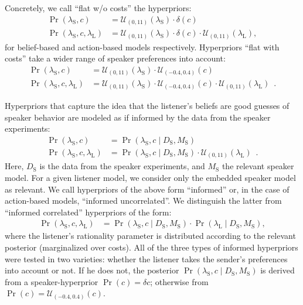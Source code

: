 Concretely, we call ``flat w/o costs'' the hyperpriors:
\begin{align*}
  \Pr(\lambda_\mathrm{S},c) & =
  \mathcal{U}_{(0,11)}(\lambda_\mathrm{S}) \cdot
  \delta(c) \\
  \Pr(\lambda_\mathrm{S},c,\lambda_\mathrm{L}) & = 
  \mathcal{U}_{(0,11)}(\lambda_\mathrm{S}) \cdot
    \delta(c) \cdot  \mathcal{U}_{(0,11)}(
    \lambda_\mathrm{L}),
\end{align*}
for belief-based and action-based models respectively. Hyperpriors
``flat with costs'' take a wider range of speaker preferences into
account: 
\begin{align*}
  \Pr(\lambda_\mathrm{S},c) & =
  \mathcal{U}_{(0,11)}(\lambda_\mathrm{S}) \cdot
  \mathcal{U}_{(-0.4,0.4)}(c) \\
  \Pr(\lambda_\mathrm{S},c,\lambda_\mathrm{L}) & = 
  \mathcal{U}_{(0,11)}(\lambda_\mathrm{S}) \cdot
    \mathcal{U}_{(-0.4,0.4)}(c) \cdot  \mathcal{U}_{(0,11)}(
    \lambda_\mathrm{L}) \enspace .
\end{align*}

Hyperpriors that capture the idea that the listener's beliefs are good
guesses of speaker behavior are modeled as if informed by the data
from the speaker experiments:
\begin{align*}
  \Pr(\lambda_\mathrm{S},c) & = \Pr(\lambda_\mathrm{S},c \mid D_\mathrm{S}, M_\mathrm{S}) \\
  \Pr(\lambda_\mathrm{S},c,\lambda_\mathrm{L}) & = 
   \Pr(\lambda_\mathrm{S},c \mid D_\mathrm{S}, M_\mathrm{S}) \cdot  \mathcal{U}_{(0,11)}(
    \lambda_\mathrm{L}) \enspace .
\end{align*}
Here, $D_\mathrm{S}$ is the data from the speaker experiments, and
$M_\mathrm{S}$ the relevant speaker model. For a given listener model,
we consider only the embedded speaker model as relevant. We call
hyperpriors of the above form ``informed'' or, in the case of
action-based models, ``informed uncorrelated''. We distinguish the
latter from ``informed correlated'' hyperpriors of the form:
\begin{align*}
  \Pr(\lambda_\mathrm{S},c,\lambda_\mathrm{L}) & = 
   \Pr(\lambda_\mathrm{S},c \mid D_\mathrm{S}, M_\mathrm{S}) \cdot \Pr(\lambda_\mathrm{L} \mid D_\mathrm{S}, M_\mathrm{S}),
\end{align*}
where the listener's rationality parameter is distributed according to
the relevant posterior (marginalized over costs). All of the three
types of informed hyperpriors were tested in two varieties: whether
the listener takes the sender's preferences into account or not. If he
does not, the posterior $\Pr(\lambda_\mathrm{S},c \mid D_\mathrm{S},
M_\mathrm{S})$ is derived from a speaker-hyperprior $\Pr(c) =
\delta{c}$; otherwise from $\Pr(c) = \mathcal{U}_{(-0.4,0.4)}(c)$.

